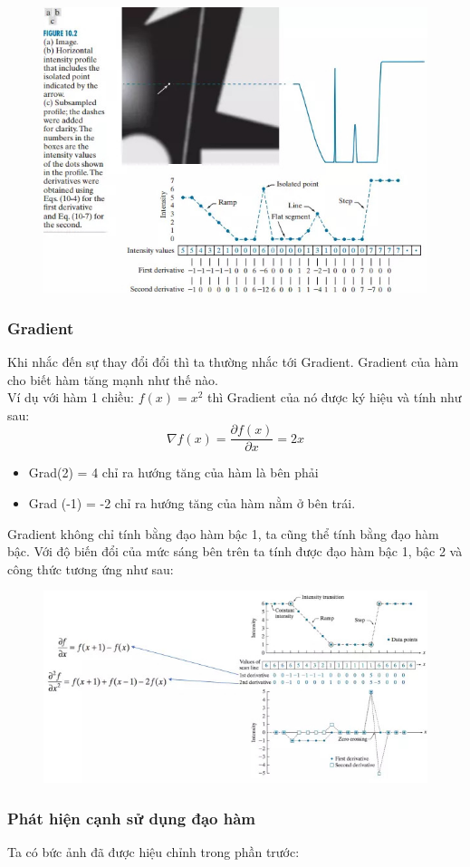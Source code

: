 \begin{figure}[htbp]
    \centering
    \includegraphics[width=0.5\linewidth]{images/3-lane/edge.jpg}
\end{figure}
\subsubsection*{Gradient}
Khi nhắc đến sự thay đổi đổi thì ta thường nhắc tới Gradient. Gradient của hàm cho biết hàm tăng mạnh như thế nào.\\
Ví dụ với hàm 1 chiều: $f(x) = x^2$ thì Gradient của nó được ký hiệu và tính như sau: $$\nabla f(x) = \frac{\partial f(x)}{\partial x} = 2x$$
\begin{itemize}
    \item Grad(2) = 4 chỉ ra hướng tăng của hàm là bên phải
    \item Grad (-1) = -2 chỉ ra hướng tăng của hàm nằm ở bên trái.
\end{itemize}
Gradient không chỉ tính bằng đạo hàm bậc 1, ta cũng thể tính bằng đạo hàm bậc. Với độ biến đổi của mức sáng bên trên ta tính được đạo hàm bậc 1, bậc 2 và công thức tương ứng như sau: 
\begin{figure}[htbp]
    \centering
    \includegraphics[width=0.5\linewidth]{images/3-lane/gradgrad.jpg}
\end{figure}
\newpage
\subsubsection{Phát hiện cạnh sử dụng đạo hàm}
Ta có bức ảnh đã được hiệu chỉnh trong phần trước:\\

